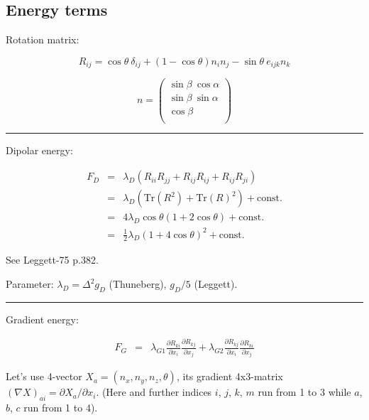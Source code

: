 \documentclass[a4paper]{article}
\begin{document}
\def\ct{\cos\theta}
\def\st{\sin\theta}
\def\cts{\cos^2\theta}
\def\sts{\sin^2\theta}

\def\bn{{\bf n}}
\def\bH{{\bf H}}
\def\bvsn{{(\bf v_s - v_n)}}
\def\Tr{\mbox{Tr}}
\def\const{\mbox{const.}}
\def\dd#1#2{\frac{\partial #1}{\partial #2}}


\subsection*{Energy terms}

Rotation matrix:

$$
R_{ij} = \ct\ \delta_{ij} + (1-\ct) n_i n_j - \st\ e_{ijk} n_k
$$

$$
n = \left(
\begin{array}{l}
\sin\beta\ \cos\alpha\\
\sin\beta\ \sin\alpha\\
\cos\beta\\
\end{array}
\right)
$$

\medskip\hrule\medskip

Dipolar energy:

\begin{eqnarray*}
F_D&=&\lambda_D (R_{ii}R_{jj} + R_{ij}R_{ij} + R_{ij}R_{ji})\\
   &=&\lambda_D (\Tr(R^2) + \Tr(R)^2) + \const\\
   &=&4\lambda_D \cos\theta (1+2\cos\theta) + \const\\
   &=&\frac12 \lambda_D (1+4\cos\theta)^2 + \const
\end{eqnarray*}

See Leggett-75 p.382.

Parameter: $\lambda_D = \Delta^2 g_D$ (Thuneberg), $g_D/5$ (Leggett).

\medskip\hrule\medskip
\def\lga{\lambda_{G1}}
\def\lgb{\lambda_{G2}}
\def\lgs{(\lambda_{G1}+\lambda_{G2})}
\def\lgd{(\lambda_{G1}-\lambda_{G2})}

Gradient energy:

\begin{eqnarray*}
F_{G} &=&
\lga \dd{R_{ki}}{x_i} \dd{R_{kj}}{x_j} +
\lgb \dd{R_{kj}}{x_i} \dd{R_{ki}}{x_j}
\end{eqnarray*}

Let's use 4-vector $X_a = (n_x, n_y, n_z, \theta)$, its gradient
4x3-matrix $(\nabla X)_{ai} = \partial X_a / \partial x_i$. (Here and
further indices $i$, $j$, $k$, $m$ run from 1 to 3 while $a$, $b$, $c$
run from 1 to 4).
\end{document}
